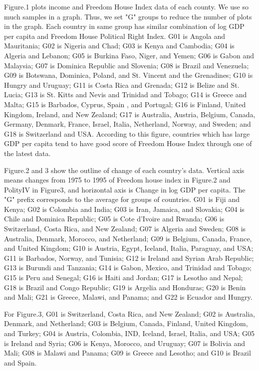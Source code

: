 \documentclass[a4paper,11pt]{article}
\begin{document}
Figure.1 plots income and Freedom House Index data of each county. We use so much samples in a graph. Thus, we set "G" groups to reduce the number of plots in the graph. Each country in same group has similar combination of log GDP per capita and Freedom House Political Right Index. G01 is Angola and Mauritania; G02 is Nigeria and Chad; G03 is Kenya and Cambodia; G04 is Algeria and Lebanon; G05 is Burkina Faso, Niger, and Yemen; G06 is Gabon and Malaysia; G07 is Dominica Republic and Slovenia; G08 is Brazil and Venezuela; G09 is Botswana, Dominica, Poland, and St. Vincent and the Grenadines; G10 is Hungry and Uruguay; G11 is Costa Rica and Grenada; G12 is Belize and St. Lucia; G13 is St. Kitts and Nevis and Trinidad and Tobago; G14 is Greece and Malta; G15 is Barbados, Cyprus, Spain , and Portugal; G16 is Finland, United Kingdom, Ireland, and New Zealand; G17 is Australia, Austria, Belgium, Canada, Germany, Denmark, France, Israel, Italia, Netherland, Norway, and Sweden; and G18 is Switzerland and USA. According to this figure, countries which has large GDP per capita tend to have good score of Freedom House Index through one of the latest data.


Figure.2 and 3 show the outline of change of each country’s data. Vertical axis means changes from 1975 to 1995 of Freedom house index in Figure.2 and PolityI\hspace{-.1em}V in Figure3, and horizontal axis is Change in log GDP per capita. The "G" prefix corresponds to the average for groups of countries. G01 is Fiji and Kenya; G02 is Colombia and India; G03 is Iran, Jamaica, and Slovakia; G04 is Chile and Dominica Republic; G05 is Cote d’Ivoire and Rwanda; G06 is Switzerland, Costa Rica, and New Zealand; G07 is Algeria and Sweden; G08 is Australia, Denmark, Morocco, and Netherland; G09 is Belgium, Canada, France, and United Kingdom; G10 is Austria, Egypt, Iceland, Italia, Paraguay, and USA; G11 is Barbados, Norway, and Tunisia; G12 is Ireland and Syrian Arab Republic; G13 is Burundi and Tanzania; G14 is Gabon, Mexico, and Trinidad and Tobago; G15 is Peru and Senegal; G16 is Haiti and Jordan; G17 is Lesotho and Nepal; G18 is Brazil and Congo Republic; G19 is Argelia and Honduras; G20 is Benin and Mali; G21 is Greece, Malawi, and Panama; and G22 is Ecuador and Hungry.


For Figure.3, G01 is Switzerland, Costa Rica, and New Zealand; G02 is Australia, Denmark, and Netherland; G03 is Belgium, Canada, Finland, United Kingdom, and Turkey; G04 is Austria, Colombia, IND, Iceland, Israel, Italia, and USA; G05 is Ireland and Syria; G06 is Kenya, Morocco, and Uruguay; G07 is Bolivia and Mali; G08 is Malawi and Panama; G09 is Greece and Lesotho; and G10 is Brazil and Spain. 
\end{document}
